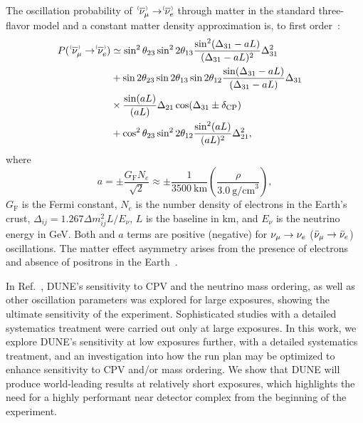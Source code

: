 The oscillation probability of $\;\nu^{\bracketbar}_\mu \rightarrow \nu^{\bracketbar}_e$ through matter in the standard three-flavor model and a constant matter density approximation is, to first order~\cite{Nunokawa:2007qh}:
\begin{equation}
  \begin{aligned}
    P(\;\nu^{\bracketbar}_\mu \rightarrow \nu^{\bracketbar}_e) & \simeq \sin^2 \theta_{23} \sin^2 2 \theta_{13} 
    \frac{ \sin^2(\Delta_{31} - aL)}{(\Delta_{31}-aL)^2} \Delta_{31}^2 \\
    & + \sin 2 \theta_{23} \sin 2 \theta_{13} \sin 2 \theta_{12}\frac{ \sin(\Delta_{31} - aL)}{(\Delta_{31}-aL)} \Delta_{31} \\
    &\times \frac{\sin(aL)}{(aL)} \Delta_{21} \cos (\Delta_{31} \pm \deltacp) & \\
    & + \cos^2 \theta_{23} \sin^2 2 \theta_{12} \frac {\sin^2(aL)}{(aL)^2} \Delta_{21}^2,
  \end{aligned}
  \label{eqn:appprob}
\end{equation}
where
\begin{equation*}
  a = \pm \frac{G_{\mathrm{F}}N_e}{\sqrt{2}} \approx \pm\frac{1}{3500~\mathrm{km}}\left(\frac{\rho}{3.0~\mathrm{g/cm}^{3}}\right),
\end{equation*}
$G_{\mathrm{F}}$ is the Fermi constant, $N_e$ is the number density of electrons in the Earth's crust, $\Delta_{ij} = 1.267 \Delta m^2_{ij} L/E_\nu$, $L$ is the baseline in km, and $E_\nu$ is the neutrino energy in GeV. 
Both \deltacp and $a$ terms are positive (negative) for $\nu_\mu \to \nu_e$ ($\bar\nu_\mu \to \bar\nu_e$) oscillations. The matter effect asymmetry arises from the presence of electrons and absence of positrons in the Earth~\cite{Wolfenstein:1977ue,Mikheev:1986gs}.

In Ref.~\cite{Abi:2020qib}, DUNE's sensitivity to CPV and the neutrino mass ordering, as well as other oscillation parameters was explored for large exposures, showing the ultimate sensitivity of the experiment. Sophisticated studies with a detailed systematics treatment were carried out only at large exposures. In this work, we explore DUNE's sensitivity at low exposures further, with a detailed systematics treatment, and an investigation into how the run plan may be optimized to enhance sensitivity to CPV and/or mass ordering. We show that DUNE will produce world-leading results at relatively short exposures, which highlights the need for a highly performant near detector complex from the beginning of the experiment. 

